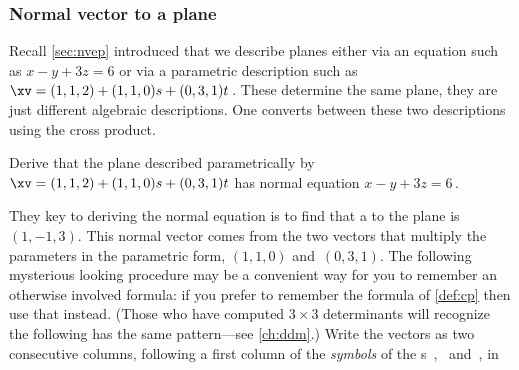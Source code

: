 \subsubsection{Normal vector to a plane}
Recall \cref{sec:nvep} introduced that we describe planes either via an equation such as \(x-y+3z=6\) or via a parametric description such as \(\xv=(1,1,2)+(1,1,0)s+(0,3,1)t\)\,.
These determine the same plane, they are just different algebraic descriptions.
One converts between these two descriptions using the cross product.




\begin{example} \label{eg:nviax}
Derive that the plane described parametrically by \(\xv=(1,1,2)+(1,1,0)s+(0,3,1)t\) has normal equation \(x-y+3z=6\)\,.
\begin{solution} 
They key to deriving the normal equation is to find that a  to the plane is~\((1,-1,3)\).
This normal vector comes from the two vectors that multiply the parameters in the parametric form, \((1,1,0)\) and~\((0,3,1)\).
The following mysterious looking procedure may be a convenient way for you to remember an otherwise involved formula: if you prefer to remember the formula of \cref{def:cp} then use that instead.
(Those who have computed \(3\times3\) determinants will recognize the following has the same pattern---see \cref{ch:ddm}.)
Write the vectors as two consecutive columns, following a first column of the \emph{symbols} of the s~\iv, \jv\ and~\kv, in
\setlength{\unitlength}{1.2ex}
\def\abc#1{\begin{vmatrix}\begin{picture}(5.3,6)
\put(0,4){$\iv$}\put(2,4){$1$}\put(4,4){$0$}
\put(0,2){$\jv$}\put(2,2){$1$}\put(4,2){$3$}
\put(0,0){$\kv$}\put(2,0){$0$}\put(4,0){$1$}
\ifnum1=#1\put(0.5,-0.5){\line(0,1)6}\put(-0.5,4.5){\line(1,0)6}\fi
\ifnum2=#1\put(0.5,-0.5){\line(0,1)6}\put(-0.5,2.5){\line(1,0)6}\fi
\ifnum3=#1\put(0.5,-0.5){\line(0,1)6}\put(-0.5,0.5){\line(1,0)6}\fi
\end{picture}\end{vmatrix}}
\def\ab#1#2#3#4{\begin{vmatrix}\begin{picture}(3,4)
\put(0,2){$#1$}\put(2,2){$#2$}
\put(0,0){$#3$}\put(2,0){$#4$}
\color{red}\put(-0.5,-0.5){\line(1,1)4}
\color{blue}\put(-0.5,3.5){\line(1,-1)4}
\end{picture}\end{vmatrix}}
\begin{eqnarray*}

\end{eqnarray*}
\end{solution}
\end{example}
